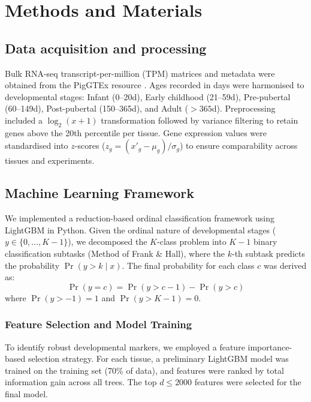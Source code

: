\section{Methods and Materials}

\subsection{Data acquisition and processing}
Bulk RNA-seq transcript-per-million (TPM) matrices and metadata were obtained from the PigGTEx resource \cite{teng2024,chen2025piggtex}. Ages recorded in days were harmonised to developmental stages: Infant (0--20d), Early childhood (21--59d), Pre-pubertal (60--149d), Post-pubertal (150--365d), and Adult ($>365$d).
Preprocessing included a $\log_2(x+1)$ transformation followed by variance filtering to retain genes above the 20th percentile per tissue. Gene expression values were standardised into $z$-scores ($z_g = (x'_g - \mu_g)/\sigma_g$) to ensure comparability across tissues and experiments.

\subsection{Machine Learning Framework}
We implemented a reduction-based ordinal classification framework using LightGBM \cite{ke2017lightgbm} in Python. Given the ordinal nature of developmental stages ($y \in \{0,\dots,K-1\}$), we decomposed the $K$-class problem into $K-1$ binary classification subtasks (Method of Frank \& Hall), where the $k$-th subtask predicts the probability $\Pr(y > k \mid x)$. The final probability for each class $c$ was derived as:
\begin{equation}
\Pr(y=c) = \Pr(y > c-1) - \Pr(y > c)
\label{eq:ordinal_prob}
\end{equation}
where $\Pr(y > -1) = 1$ and $\Pr(y > K-1) = 0$.

\subsubsection{Feature Selection and Model Training}
To identify robust developmental markers, we employed a feature importance-based selection strategy. For each tissue, a preliminary LightGBM model was trained on the training set (70\% of data), and features were ranked by total information gain across all trees. The top $d \le 2000$ features were selected for the final model.


